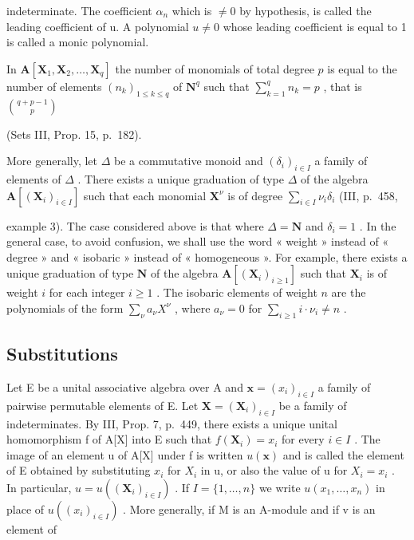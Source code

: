 indeterminate. The coefficient \(\alpha_{n}\) which is \(\neq0\) by hypothesis, is called the leading coefficient of u. A polynomial \(u\neq0\) whose leading coefficient is equal to 1 is called a monic polynomial.

In \(\mathbf{A}[\mathbf{X}_1, \mathbf{X}_2, \ldots, \mathbf{X}_q]\) the number of monomials of total degree \(p\) is equal to the number of elements \((n_k)_{1 \leqslant k \leqslant q}\) of \(\mathbf{N}^q\) such that \(\sum_{k=1}^{q} n_k = p\) , that is \(\binom{q + p - 1}{p}\)

(Sets III, Prop. 15, p.~182).

More generally, let \(\Delta\) be a commutative monoid and \((\delta_i)_{i \in I}\) a family of elements of \(\Delta\) . There exists a unique graduation of type \(\Delta\) of the algebra \(\mathbf{A}[(\mathbf{X}_i)_{i \in I}]\) such that each monomial \(\mathbf{X}^\nu\) is of degree \(\sum_{i \in I} \nu_i \delta_i\) (III, p.~458,

example 3). The case considered above is that where \(\Delta = \mathbf{N}\) and \(\delta_{i} = 1\) . In the general case, to avoid confusion, we shall use the word « weight » instead of « degree » and « isobaric » instead of « homogeneous ». For example, there exists a unique graduation of type \(\mathbf{N}\) of the algebra \(\mathbf{A}[(\mathbf{X}_{i})_{i\geqslant 1}]\) such that \(\mathbf{X}_i\) is of weight \(i\) for each integer \(i \geqslant 1\) . The isobaric elements of weight \(n\) are the polynomials of the form \(\sum_{\nu} a_{\nu} X^{\nu}\) , where \(a_{\nu} = 0\) for \(\sum_{i \geqslant 1} i \cdot \nu_i \neq n\) .

\subsection{Substitutions}

Let E be a unital associative algebra over A and \(\mathbf{x} = (x_{i})_{i \in I}\) a family of pairwise permutable elements of E. Let \(\mathbf{X} = (\mathbf{X}_{i})_{i \in I}\) be a family of indeterminates. By III, Prop. 7, p.~449, there exists a unique unital homomorphism f of A{[}X{]} into E such that \(f(\mathbf{X}_{i}) = x_{i}\) for every \(i \in I\) . The image of an element u of A{[}X{]} under f is written \(u(\mathbf{x})\) and is called the element of E obtained by substituting \(x_{i}\) for \(X_{i}\) in u, or also the value of u for \(X_{i} = x_{i}\) . In particular, \(u = u((\mathbf{X}_{i})_{i \in I})\) . If \(I = \{1, \ldots, n\}\) we write \(u(x_{1}, \ldots, x_{n})\) in place of \(u((x_{i})_{i \in I})\) . More generally, if M is an A-module and if v is an element of

